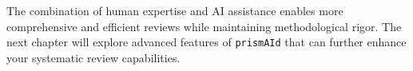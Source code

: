 
The combination of human expertise and AI assistance enables more comprehensive and efficient reviews while maintaining methodological rigor. The next chapter will explore advanced features of \texttt{prismAId} that can further enhance your systematic review capabilities.
